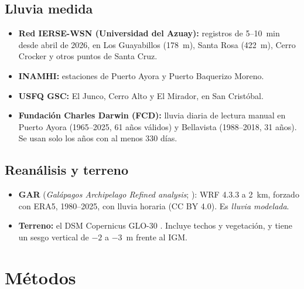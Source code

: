 \documentclass{sosg-informe}
\begin{document}
\subsection{Lluvia medida}
\begin{itemize}
  \item \textbf{Red IERSE-WSN (Universidad del Azuay):} registros de 5--10~min desde abril de 2026, en Los Guayabillos (178~m), Santa Rosa (422~m), Cerro Crocker y otros puntos de Santa Cruz.
  \item \textbf{INAMHI:} estaciones de Puerto Ayora y Puerto Baquerizo Moreno.
  \item \textbf{USFQ GSC:} El Junco, Cerro Alto y El Mirador, en San Cristóbal.
  \item \textbf{Fundación Charles Darwin (FCD):} lluvia diaria de lectura manual en Puerto Ayora (1965--2025, 61 años válidos) y Bellavista (1988--2018, 31 años). Se usan solo los años con al menos 330 días.
\end{itemize}

\subsection{Reanálisis y terreno}
\begin{itemize}
  \item \textbf{GAR} (\emph{Galápagos Archipelago Refined analysis}; \citealp{schmidt2025}): WRF 4.3.3 a 2~km, forzado con ERA5, 1980--2025, con lluvia horaria (CC BY 4.0). Es \emph{lluvia modelada}.
  \item \textbf{Terreno:} el DSM Copernicus GLO-30 \citep{esa2021}. Incluye techos y vegetación, y tiene un sesgo vertical de $-2$ a $-3$~m frente al IGM.
\end{itemize}

\section{Métodos}
\end{document}
